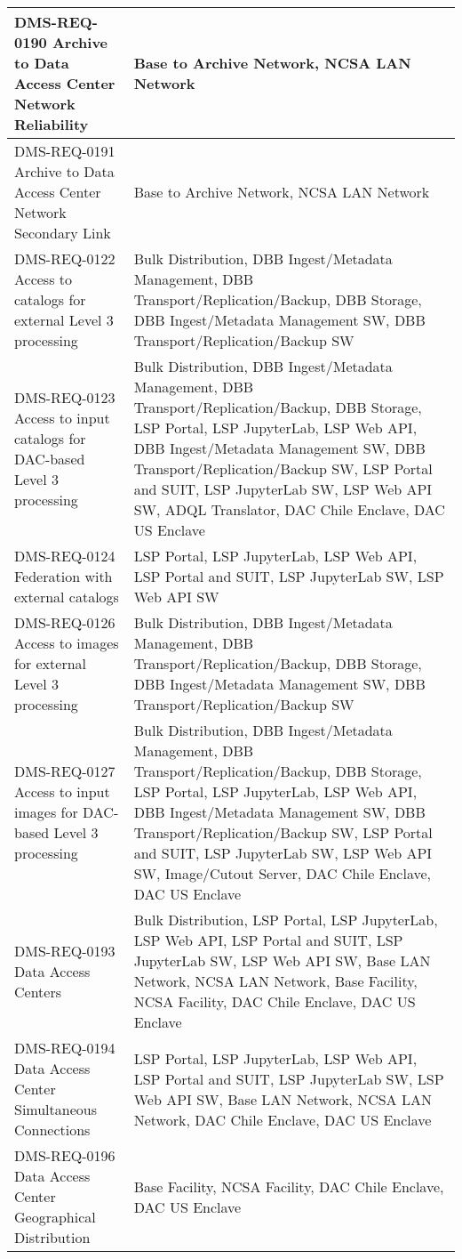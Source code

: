 \begin{xtabular}{p{0.4\textwidth}p{0.55\textwidth}}
DMS-REQ-0190 Archive to Data Access Center Network Reliability & Base to Archive Network, NCSA LAN Network \\ \hline
DMS-REQ-0191 Archive to Data Access Center Network Secondary Link & Base to Archive Network, NCSA LAN Network \\ \hline
DMS-REQ-0122 Access to catalogs for external Level 3 processing & Bulk Distribution, DBB Ingest/Metadata Management, DBB Transport/Replication/Backup, DBB Storage, DBB Ingest/Metadata Management SW, DBB Transport/Replication/Backup SW \\ \hline
DMS-REQ-0123 Access to input catalogs for DAC-based Level 3 processing & Bulk Distribution, DBB Ingest/Metadata Management, DBB Transport/Replication/Backup, DBB Storage, LSP Portal, LSP JupyterLab, LSP Web API, DBB Ingest/Metadata Management SW, DBB Transport/Replication/Backup SW, LSP Portal and SUIT, LSP JupyterLab SW, LSP Web API SW, ADQL Translator, DAC Chile Enclave, DAC US Enclave \\ \hline
DMS-REQ-0124 Federation with external catalogs & LSP Portal, LSP JupyterLab, LSP Web API, LSP Portal and SUIT, LSP JupyterLab SW, LSP Web API SW \\ \hline
DMS-REQ-0126 Access to images for external Level 3 processing & Bulk Distribution, DBB Ingest/Metadata Management, DBB Transport/Replication/Backup, DBB Storage, DBB Ingest/Metadata Management SW, DBB Transport/Replication/Backup SW \\ \hline
DMS-REQ-0127 Access to input images for DAC-based Level 3 processing & Bulk Distribution, DBB Ingest/Metadata Management, DBB Transport/Replication/Backup, DBB Storage, LSP Portal, LSP JupyterLab, LSP Web API, DBB Ingest/Metadata Management SW, DBB Transport/Replication/Backup SW, LSP Portal and SUIT, LSP JupyterLab SW, LSP Web API SW, Image/Cutout Server, DAC Chile Enclave, DAC US Enclave \\ \hline
DMS-REQ-0193 Data Access Centers & Bulk Distribution, LSP Portal, LSP JupyterLab, LSP Web API, LSP Portal and SUIT, LSP JupyterLab SW, LSP Web API SW, Base LAN Network, NCSA LAN Network, Base Facility, NCSA Facility, DAC Chile Enclave, DAC US Enclave \\ \hline
DMS-REQ-0194 Data Access Center Simultaneous Connections & LSP Portal, LSP JupyterLab, LSP Web API, LSP Portal and SUIT, LSP JupyterLab SW, LSP Web API SW, Base LAN Network, NCSA LAN Network, DAC Chile Enclave, DAC US Enclave \\ \hline
DMS-REQ-0196 Data Access Center Geographical Distribution & Base Facility, NCSA Facility, DAC Chile Enclave, DAC US Enclave \\ \hline

\end{xtabular}
